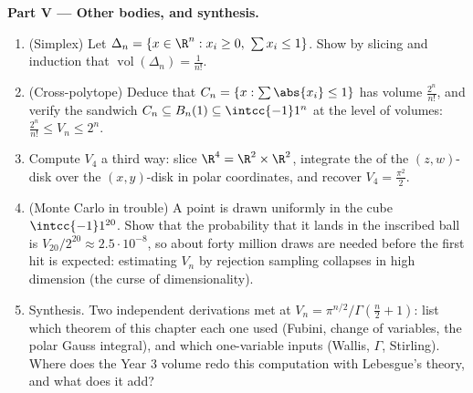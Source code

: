 \begin{problem}[{Weekend problem --- $V_n =
\pi^{n/2}/\Gamma(\frac n2 + 1)$, and the strangeness of high
dimensions}]
\medskip
\noindent\textbf{Part V --- Other bodies, and synthesis.}
\begin{enumerate}[resume]
  \item (Simplex) Let $\Delta_n = \{x \in \R^n : x_i \geq 0,\
        \sum x_i \leq 1\}$. Show by slicing and induction that
        $\operatorname{vol}(\Delta_n) = \frac1{n!}$.
  \item (Cross-polytope) Deduce that $C_n = \{x :
        \sum\abs{x_i} \leq 1\}$ has volume $\frac{2^n}{n!}$,
        and verify the sandwich $C_n \subseteq B_n(1)
        \subseteq \intcc{-1}1^n$ at the level of volumes:
        $\frac{2^n}{n!} \leq V_n \leq 2^n$.
  \item Compute $V_4$ a third way: slice $\R^4 = \R^2 \times
        \R^2$, integrate the  of the $(z, w)$-disk over
        the $(x, y)$-disk in polar coordinates, and recover
        $V_4 = \frac{\pi^2}2$.
  \item (Monte Carlo in trouble) A point is drawn uniformly
        in the cube $\intcc{-1}1^{20}$. Show that the
        probability that it lands in the inscribed ball is
        $V_{20}/2^{20} \approx 2.5\cdot10^{-8}$, so about
        forty million draws are needed before the first hit
        is expected: estimating $V_n$ by rejection sampling
        collapses in high dimension (the curse of
        dimensionality).
  \item Synthesis. Two independent derivations met at $V_n =
        \pi^{n/2}/\Gamma(\frac n2 + 1)$: list which theorem
        of this chapter each one used (Fubini, change of
        variables, the polar Gauss integral), and which
        one-variable inputs (Wallis, $\Gamma$, Stirling).
        Where does the Year 3 volume redo this computation
        with Lebesgue's theory, and what does it add?
\end{enumerate}
\end{problem}
